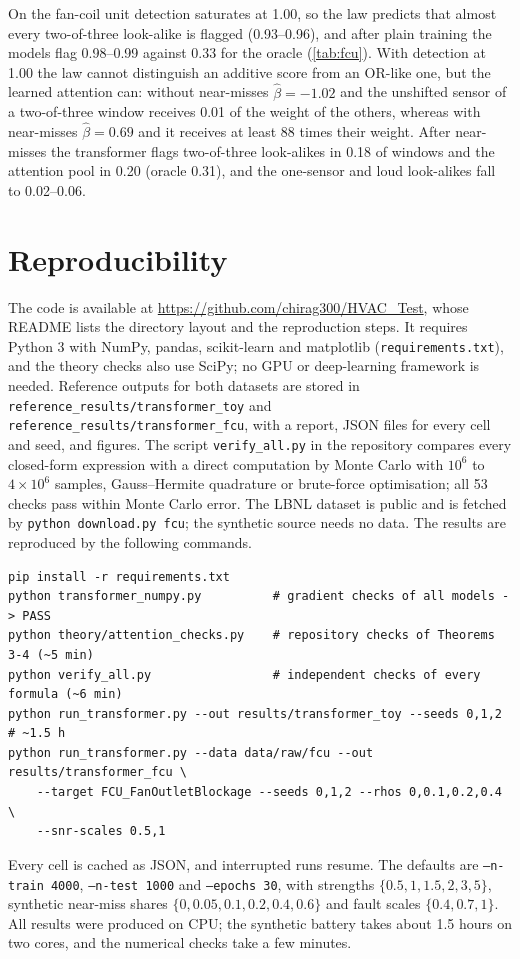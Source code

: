 On the fan-coil unit detection saturates at 1.00, so the law predicts that almost every two-of-three look-alike is flagged (0.93--0.96), and after plain training the models flag 0.98--0.99 against 0.33 for the oracle (\cref{tab:fcu}). With detection at 1.00 the law cannot distinguish an additive score from an OR-like one, but the learned attention can: without near-misses $\hat\beta=-1.02$ and the unshifted sensor of a two-of-three window receives 0.01 of the weight of the others, whereas with near-misses $\hat\beta=0.69$ and it receives at least 88 times their weight. After near-misses the transformer flags two-of-three look-alikes in 0.18 of windows and the attention pool in 0.20 (oracle 0.31), and the one-sensor and loud look-alikes fall to 0.02--0.06.

\FloatBarrier
\section{Reproducibility}\label{app:repro}

The code is available at \url{https://github.com/chirag300/HVAC_Test}, whose README lists the directory layout and the reproduction steps. It requires Python 3 with NumPy, pandas, scikit-learn and matplotlib (\texttt{requirements.txt}), and the theory checks also use SciPy; no GPU or deep-learning framework is needed. Reference outputs for both datasets are stored in \texttt{reference\_results/transformer\_toy} and \texttt{reference\_results/transformer\_fcu}, with a report, JSON files for every cell and seed, and figures. The script \texttt{verify\_all.py} in the repository compares every closed-form expression with a direct computation by Monte Carlo with $10^6$ to $4\times10^6$ samples, Gauss--Hermite quadrature or brute-force optimisation; all 53 checks pass within Monte Carlo error. The LBNL dataset \citep{granderson2023} is public and is fetched by \texttt{python download.py fcu}; the synthetic source needs no data. The results are reproduced by the following commands.
{\small
\begin{verbatim}
pip install -r requirements.txt
python transformer_numpy.py          # gradient checks of all models -> PASS
python theory/attention_checks.py    # repository checks of Theorems 3-4 (~5 min)
python verify_all.py                 # independent checks of every formula (~6 min)
python run_transformer.py --out results/transformer_toy --seeds 0,1,2     # ~1.5 h
python run_transformer.py --data data/raw/fcu --out results/transformer_fcu \
    --target FCU_FanOutletBlockage --seeds 0,1,2 --rhos 0,0.1,0.2,0.4 \
    --snr-scales 0.5,1
\end{verbatim}}
\noindent Every cell is cached as JSON, and interrupted runs resume. The defaults are \texttt{--n-train 4000}, \texttt{--n-test 1000} and \texttt{--epochs 30}, with strengths $\{0.5,1,1.5,2,3,5\}$, synthetic near-miss shares $\{0,0.05,0.1,0.2,0.4,0.6\}$ and fault scales $\{0.4,0.7,1\}$. All results were produced on CPU; the synthetic battery takes about 1.5 hours on two cores, and the numerical checks take a few minutes.
